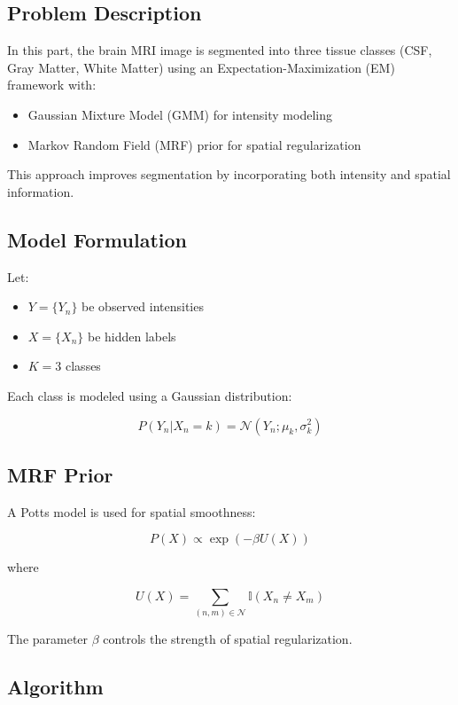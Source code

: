 \documentclass[11pt]{article}
\begin{document}
\subsection{Problem Description}

In this part, the brain MRI image is segmented into three tissue classes (CSF, Gray Matter, White Matter) using an Expectation-Maximization (EM) framework with:

\begin{itemize}
\item Gaussian Mixture Model (GMM) for intensity modeling
\item Markov Random Field (MRF) prior for spatial regularization
\end{itemize}

This approach improves segmentation by incorporating both intensity and spatial information.

\subsection{Model Formulation}

Let:

\begin{itemize}
\item $Y = \{Y_n\}$ be observed intensities
\item $X = \{X_n\}$ be hidden labels
\item $K = 3$ classes
\end{itemize}

Each class is modeled using a Gaussian distribution:

\[
P(Y_n | X_n = k) = \mathcal{N}(Y_n; \mu_k, \sigma_k^2)
\]

\subsection{MRF Prior}

A Potts model is used for spatial smoothness:

\[
P(X) \propto \exp(-\beta U(X))
\]

where

\[
U(X) = \sum_{(n,m) \in \mathcal{N}} \mathbb{I}(X_n \neq X_m)
\]

The parameter $\beta$ controls the strength of spatial regularization.


\subsection{Algorithm}
\end{document}

